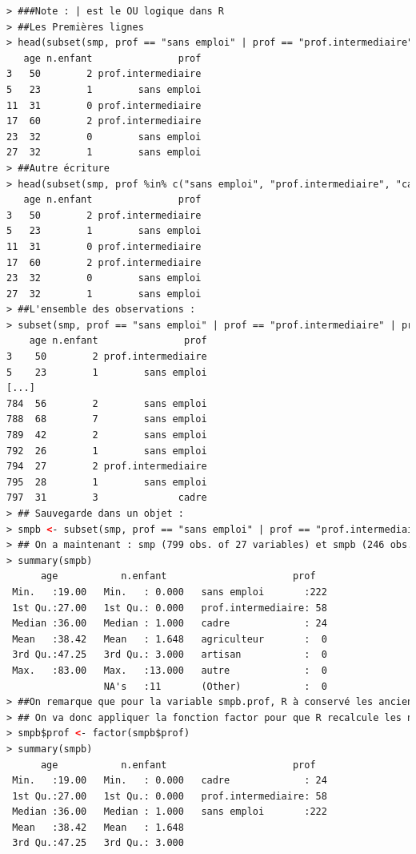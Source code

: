 \begin{lstlisting}[language=html]
> ###Note : | est le OU logique dans R
> ##Les Premières lignes
> head(subset(smp, prof == "sans emploi" | prof == "prof.intermediaire" | prof == "cadre", c(age,n.enfant,prof)))
   age n.enfant               prof
3   50        2 prof.intermediaire
5   23        1        sans emploi
11  31        0 prof.intermediaire
17  60        2 prof.intermediaire
23  32        0        sans emploi
27  32        1        sans emploi
> ##Autre écriture
> head(subset(smp, prof %in% c("sans emploi", "prof.intermediaire", "cadre"), c(age, n.enfant, prof)))
   age n.enfant               prof
3   50        2 prof.intermediaire
5   23        1        sans emploi
11  31        0 prof.intermediaire
17  60        2 prof.intermediaire
23  32        0        sans emploi
27  32        1        sans emploi
> ##L'ensemble des observations :
> subset(smp, prof == "sans emploi" | prof == "prof.intermediaire" | prof == "cadre", c(age,n.enfant,prof))
    age n.enfant               prof
3    50        2 prof.intermediaire
5    23        1        sans emploi
[...]
784  56        2        sans emploi
788  68        7        sans emploi
789  42        2        sans emploi
792  26        1        sans emploi
794  27        2 prof.intermediaire
795  28        1        sans emploi
797  31        3              cadre
> ## Sauvegarde dans un objet :
> smpb <- subset(smp, prof == "sans emploi" | prof == "prof.intermediaire" | prof == "cadre", c(age,n.enfant,prof))
> ## On a maintenant : smp (799 obs. of 27 variables) et smpb (246 obs. of 3 variables)
> summary(smpb)
      age           n.enfant                      prof    
 Min.   :19.00   Min.   : 0.000   sans emploi       :222  
 1st Qu.:27.00   1st Qu.: 0.000   prof.intermediaire: 58  
 Median :36.00   Median : 1.000   cadre             : 24  
 Mean   :38.42   Mean   : 1.648   agriculteur       :  0  
 3rd Qu.:47.25   3rd Qu.: 3.000   artisan           :  0  
 Max.   :83.00   Max.   :13.000   autre             :  0  
                 NA's   :11       (Other)           :  0  
> ##On remarque que pour la variable smpb.prof, R à conservé les anciens niveaux qui n'ont plus lieu d'être ici
> ## On va donc appliquer la fonction factor pour que R recalcule les niveaux de la variable
> smpb$prof <- factor(smpb$prof)
> summary(smpb)
      age           n.enfant                      prof    
 Min.   :19.00   Min.   : 0.000   cadre             : 24  
 1st Qu.:27.00   1st Qu.: 0.000   prof.intermediaire: 58  
 Median :36.00   Median : 1.000   sans emploi       :222  
 Mean   :38.42   Mean   : 1.648                           
 3rd Qu.:47.25   3rd Qu.: 3.000                           

\end{lstlisting}
